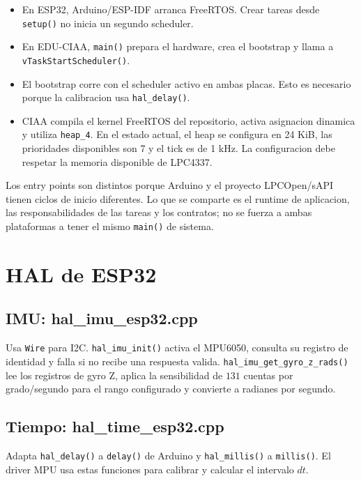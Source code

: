 \documentclass[11pt,a4paper]{article}
\begin{document}
\begin{itemize}
  \item En ESP32, Arduino/ESP-IDF arranca FreeRTOS. Crear tareas desde
        \texttt{setup()} no inicia un segundo scheduler.
  \item En EDU-CIAA, \texttt{main()} prepara el hardware, crea el bootstrap y
        llama a \texttt{vTaskStartScheduler()}.
  \item El bootstrap corre con el scheduler activo en ambas placas. Esto es
        necesario porque la calibracion usa \texttt{hal\_delay()}.
  \item CIAA compila el kernel FreeRTOS del repositorio, activa asignacion
        dinamica y utiliza \texttt{heap\_4}. En el estado actual, el heap se
        configura en 24 KiB, las prioridades disponibles son 7 y el tick es de
        1 kHz. La configuracion debe respetar la memoria disponible de LPC4337.
\end{itemize}

Los entry points son distintos porque Arduino y el proyecto LPCOpen/sAPI tienen
ciclos de inicio diferentes. Lo que se comparte es el runtime de aplicacion,
las responsabilidades de las tareas y los contratos; no se fuerza a ambas
plataformas a tener el mismo \texttt{main()} de sistema.

\section{HAL de ESP32}

\subsection{IMU: hal\_imu\_esp32.cpp}

Usa \texttt{Wire} para I2C. \texttt{hal\_imu\_init()} activa el MPU6050,
consulta su registro de identidad y falla si no recibe una respuesta valida.
\texttt{hal\_imu\_get\_gyro\_z\_rads()} lee los registros de gyro Z, aplica
la sensibilidad de $131$ cuentas por grado/segundo para el rango configurado y
convierte a radianes por segundo.

\subsection{Tiempo: hal\_time\_esp32.cpp}

Adapta \texttt{hal\_delay()} a \texttt{delay()} de Arduino y
\texttt{hal\_millis()} a \texttt{millis()}. El driver MPU usa estas funciones
para calibrar y calcular el intervalo $dt$.
\end{document}
